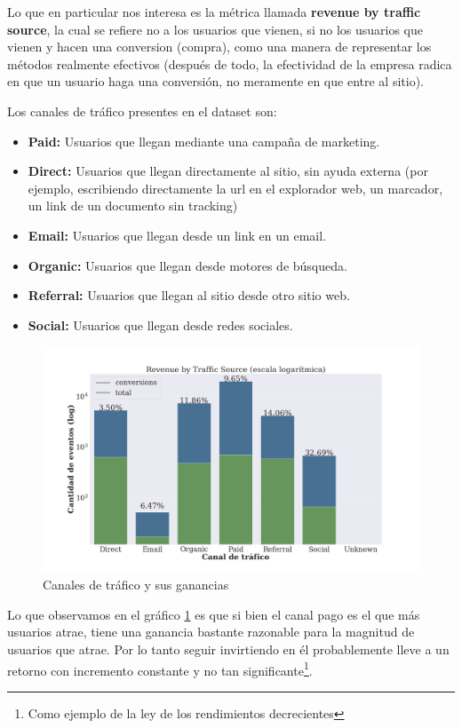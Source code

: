 \documentclass[a4paper]{article}
\begin{document}
Lo que en particular nos interesa es la métrica llamada \textbf{revenue by traffic source}, la cual se refiere no a los usuarios que vienen, si no los usuarios que vienen y hacen una conversion (compra), como una manera de representar los métodos realmente efectivos (después de todo, la efectividad de la empresa radica en que un usuario haga una conversión, no meramente en que entre al sitio).

Los canales de tráfico presentes en el dataset son:
\begin{itemize}
\item \textbf{Paid: } Usuarios que llegan mediante una campaña de marketing.
\item \textbf{Direct: } Usuarios que llegan directamente al sitio, sin ayuda externa (por ejemplo, escribiendo directamente la url en el explorador web, un marcador, un link de un documento sin tracking)
\item \textbf{Email: } Usuarios que llegan desde un link en un email.
\item \textbf{Organic: } Usuarios que llegan desde motores de búsqueda.
\item \textbf{Referral: } Usuarios que llegan al sitio desde otro sitio web.
\item \textbf{Social: } Usuarios que llegan desde redes sociales.
\end{itemize}

\begin{figure}[!h]
	\includegraphics[width=\linewidth]{figures/180-revenue_traffic-boxplot.png}
	\caption{Canales de tráfico y sus ganancias}
	\label{fig:traffic}
\end{figure}

Lo que observamos en el gráfico \ref{fig:traffic} es que si bien el canal pago es el que más usuarios atrae, tiene una ganancia bastante razonable para la magnitud de usuarios que atrae. Por lo tanto seguir invirtiendo en él probablemente lleve a un retorno con incremento constante y no tan significante\footnote{Como ejemplo de la ley de los rendimientos decrecientes}.
\end{document}
